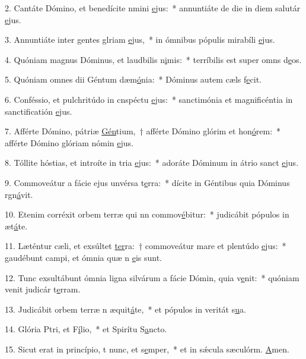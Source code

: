 2. Cantáte Dómino, et benedícite nmini \uline{e}jus:~* annuntiáte de die in diem salutár \uline{e}jus.\par 
3. Annuntiáte inter gentes glriam \uline{e}jus,~* in ómnibus pópulis mirabíli \uline{e}jus.\par 
4. Quóniam magnus Dóminus, et laudbilis n\uline{i}mis:~* terríbilis est super omns d\uline{e}os.\par 
5. Quóniam omnes dii Géntum dæm\uline{ó}nia:~* Dóminus autem cæls f\uline{e}cit.\par 
6. Conféssio, et pulchritúdo in cnspéctu \uline{e}jus:~* sanctimónia et magnificéntia in sanctificatión \uline{e}jus.\par 
7. Afférte Dómino, pátriæ \uline{Gén}tium,~† afférte Dómino glórim et hon\uline{ó}rem:~* afférte Dómino glóriam nómin \uline{e}jus.\par 
8. Tóllite hóstias, et introíte in tria \uline{e}jus:~* adoráte Dóminum in átrio sanct \uline{e}jus.\par 
9. Commoveátur a fácie ejus unvérsa t\uline{e}rra:~* dícite in Géntibus quia Dóminus rgn\uline{á}vit.\par 
10. Etenim corréxit orbem terræ qui nn commov\uline{é}bitur:~* judicábit pópulos in æt\uline{á}te.\par 
11. Læténtur cæli, et exsúltet \uline{ter}ra:~† commoveátur mare et plentúdo \uline{e}jus:~* gaudébunt campi, et ómnia quæ n \uline{e}is sunt.\par 
12. Tunc exsultábunt ómnia ligna silvárum a fácie Dómin, quia v\uline{e}nit:~* quóniam venit judicár t\uline{e}rram.\par 
13. Judicábit orbem terræ n æquit\uline{á}te,~* et pópulos in veritát s\uline{u}a.\par 
14. Glória Ptri, et F\uline{í}lio,~* et Spirítu S\uline{a}ncto.\par 
15. Sicut erat in princípio, t nunc, et s\uline{e}mper,~* et in sǽcula sæculórm. \uline{A}men.\par 
